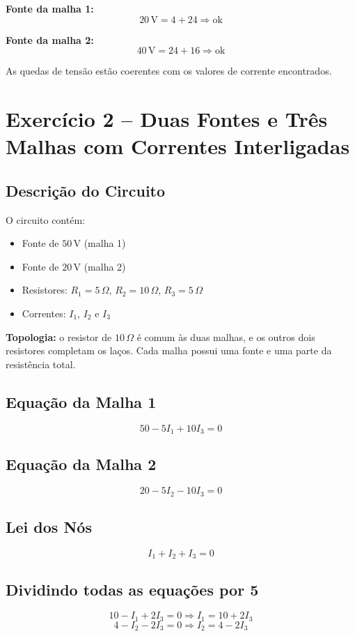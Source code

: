 \textbf{Fonte da malha 1:}
\[
20\,\text{V} = 4 + 24 \Rightarrow \text{ok}
\]

\textbf{Fonte da malha 2:}
\[
40\,\text{V} = 24 + 16 \Rightarrow \text{ok}
\]

As quedas de tensão estão coerentes com os valores de corrente encontrados.

\section{Exercício 2 – Duas Fontes e Três Malhas com Correntes Interligadas}

\subsection{Descrição do Circuito}
O circuito contém:

\begin{itemize}
    \item Fonte de $50\,\text{V}$ (malha 1)
    \item Fonte de $20\,\text{V}$ (malha 2)
    \item Resistores: $R_1 = 5\,\Omega$, $R_2 = 10\,\Omega$, $R_3 = 5\,\Omega$
    \item Correntes: $I_1$, $I_2$ e $I_3$
\end{itemize}

\textbf{Topologia:} o resistor de $10\,\Omega$ é comum às duas malhas, e os outros dois resistores completam os laços. Cada malha possui uma fonte e uma parte da resistência total.

\subsection{Equação da Malha 1}
\[
50 - 5I_1 + 10I_3 = 0 \tag{1}
\]

\subsection{Equação da Malha 2}
\[
20 - 5I_2 - 10I_3 = 0 \tag{2}
\]

\subsection{Lei dos Nós}
\[
I_1 + I_2 + I_3 = 0 \tag{3}
\]

\subsection{Dividindo todas as equações por 5}
\[
10 - I_1 + 2I_3 = 0 \Rightarrow I_1 = 10 + 2I_3 \tag{1'}
\]
\[
4 - I_2 - 2I_3 = 0 \Rightarrow I_2 = 4 - 2I_3 \tag{2'}
\]

